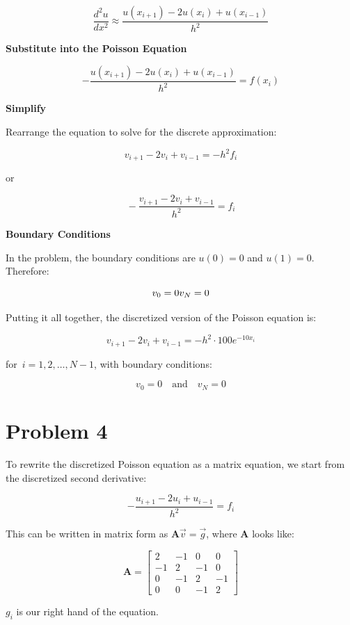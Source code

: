 \documentclass[english,notitlepage]{revtex4-1}  %
\begin{document}
$$
\frac{d^2 u}{dx^2} \approx \frac{u(x_{i+1}) - 2 u(x_i) + u(x_{i-1})}{h^2}
$$

\textbf{Substitute into the Poisson Equation}

$$
-\frac{u(x_{i+1}) - 2 u(x_i) + u(x_{i-1})}{h^2} = f(x_i)
$$

\textbf{Simplify}

Rearrange the equation to solve for the discrete approximation:

$$
v_{i+1} - 2 v_i + v_{i-1} = -h^2 f_i
$$

or

\begin{equation}{}
    -\frac{v_{i+1} - 2 v_i + v_{i-1}}{h^2} = f_i
\end{equation}

\textbf{Boundary Conditions}

In the problem, the boundary conditions are $u(0) = 0$ and $u(1) = 0$. Therefore:

$$
v_0 = 0 \\v_N = 0
$$

Putting it all together, the discretized version of the Poisson equation is:

$$
v_{i+1} - 2 v_i + v_{i-1} = -h^2 \cdot 100 e^{-10 x_i}
$$

for $i = 1, 2, \ldots, N-1$, with boundary conditions:

$$
v_0 = 0 \quad \text{and} \quad v_N = 0
$$

\section*{Problem 4}
To rewrite the discretized Poisson equation as a matrix equation, we start from the discretized second derivative:

$$
-\frac{u_{i+1} - 2u_i + u_{i-1}}{h^2} = f_i
$$

This can be written in matrix form as $\mathbf{A} \vec{v} = \vec{g}$, where  $\mathbf{A}$ looks like:

$$
\mathbf{A} = \begin{bmatrix}
2 & -1 & 0 & 0 \\
-1 & 2 & -1 & 0 \\
0 & -1 & 2 & -1 \\
0 & 0 & -1 & 2
\end{bmatrix}
$$

$g_i$ is our right hand of the equation.
\end{document}
